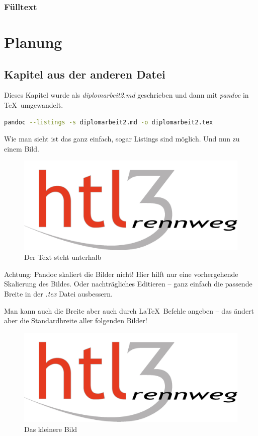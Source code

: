 \documentclass[a4paper,ngerman,naustrian,DIV=12,BCOR=1cm]{scrbook}
\begin{document}
\subsection{Fülltext}

\Blindtext


\chapter{Planung}

\section{Kapitel aus der anderen
Datei}\label{kapitel-aus-der-anderen-datei}

Dieses Kapitel wurde als \emph{diplomarbeit2.md} geschrieben und dann
mit \emph{pandoc} in \TeX~umgewandelt.

\begin{lstlisting}[language=bash]
pandoc --listings -s diplomarbeit2.md -o diplomarbeit2.tex
\end{lstlisting}

Wie man sieht ist das ganz einfach, sogar Listings sind möglich. Und nun
zu einem Bild.

\begin{figure}[htbp]
\centering
\includegraphics{HTL3RLogo.png}
\caption{Der Text steht unterhalb}
\end{figure}

Achtung: Pandoc skaliert die Bilder nicht! Hier hilft nur eine
vorhergehende Skalierung des Bildes. Oder nachträgliches Editieren --
ganz einfach die passende Breite in der \emph{.tex} Datei ausbessern.

Man kann auch die Breite aber auch durch La\TeX~Befehle angeben -- das
ändert aber die Standardbreite aller folgenden Bilder!


\begin{figure}[htbp]
\centering
\includegraphics{HTL3RLogo.png}
\caption{Das kleinere Bild}
\end{figure}
\end{document}
